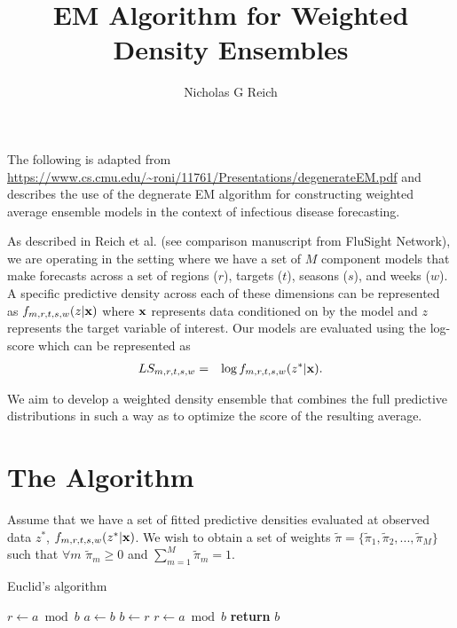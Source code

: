 \documentclass{article}
\title{EM Algorithm for Weighted Density Ensembles}
\author{Nicholas G Reich}
\begin{document}
\maketitle

The following is adapted from \url{https://www.cs.cmu.edu/~roni/11761/Presentations/degenerateEM.pdf} and describes the use of the degnerate EM algorithm for constructing weighted average ensemble models in the context of infectious disease forecasting.  

As described in Reich et al. (see comparison manuscript from FluSight Network), we are operating in the setting where we have a set of $M$ component models that make forecasts across a set of regions ($r$), targets ($t$), seasons ($s$), and weeks ($w$). 
A specific predictive density across each of these dimensions can be represented as $f_{m,r,t,s,w}(z|\bf{x})$ where $\bf{x}$ represents data conditioned on by the model and $z$ represents the target variable of interest.
Our models are evaluated using the log-score which can be represented as 
\begin{eqnarray}
LS_{m,r,t,s,w} & = & \log f_{m,r,t,s,w}(z^*|{\bf x}). \label{eqn:logscore}
\end{eqnarray}

We aim to develop a weighted density ensemble that combines the full predictive distributions in such a way as to optimize the score of the resulting average.

\section{The Algorithm}
Assume that we have a set of fitted predictive densities evaluated at observed data $z^*$, $f_{m,r,t,s,w}(z^*|{\bf x})$. We wish to obtain a set of weights $\tilde\pi = \{\tilde\pi_1, \tilde\pi_2, ..., \tilde\pi_M\}$ such that $\forall m$ $\tilde\pi_m \geq 0$ and $\sum_{m=1}^M \tilde\pi_m=1$.

\begin{algorithm}
\caption{Euclid’s algorithm}\label{alg:euclid}
\begin{algorithmic}[1]
\State $r\gets a\bmod b$
\State $a\gets b$
\State $b\gets r$
\State $r\gets a\bmod b$
\EndWhile\label{euclidendwhile}
\State \textbf{return} $b$
\EndProcedure
\end{algorithmic}
\end{algorithm}
\end{document}
